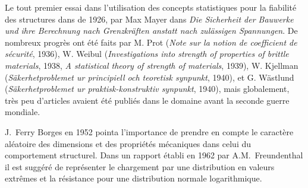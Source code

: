 \begin{histoire}
Le tout premier essai dans l'utilisation des concepts statistiques pour la fiabilité des structures dans de 1926, par Max Mayer dans \emph{Die Sicherheit der Bauwerke und ihre Berechnung nach Grenzkräften anstatt nach zulässigen Spannungen}. De nombreux progrès ont été faits par M. Prot (\emph{Note sur la notion de coefficient de sécurité}, 1936), W. Weibul (\emph{Investigations into strength of properties of brittle materials}, 1938, \emph{A statistical theory of strength of materials}, 1939), W. Kjellman (\emph{Säkerhetproblemet ur principiell och teoretisk synpunkt}, 1940), et G. Wästlund (\emph{Säkerhetproblemet ur praktisk-konstruktiv synpunkt}, 1940), mais globalement, très peu d'articles avaient été publiés dans le domaine avant la seconde guerre mondiale.

\medskip\ifVersionDuDocEstVincent\else\vspace{\smallskipamount}\fi
{}

J.~Ferry Borges en 1952 pointa l'importance de prendre en compte le caractère aléatoire des dimensions et des propriétés mécaniques dans celui du comportement structurel. Dans un rapport établi en 1962 par A.M.~Freundenthal il est suggéré de représenter le chargement par une distribution en valeurs extrêmes et la résistance pour une distribution normale logarithmique.


\end{histoire}
